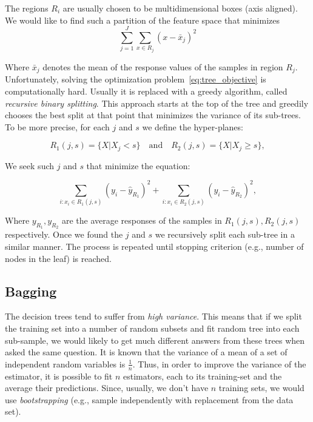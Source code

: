 \documentclass{article}
\newcommand*\mean[1]{\bar{#1}}
\begin{document}
The regions $R_i$ are usually chosen to be multidimensional boxes (axis aligned).  We would like to find such a partition of the feature space that minimizes
\begin{equation}\label{eq:tree_objective}
\sum\limits_{j=1}^J\sum_{x\in R_j}{(x-\mean{x}_j)^2}
\end{equation}

Where $\mean{x}_j$ denotes the mean of the response values of the
samples in region $R_j$.  Unfortunately, solving the optimization
problem~\ref{eq:tree_objective} is computationally hard.  Usually it
is replaced with a greedy algorithm, called \textit{recursive binary
  splitting}.  This approach starts at the top of the tree and
greedily chooses the best split at that point that minimizes the
variance of its sub-trees.  To be more precise, for each $j$ and $s$ we
define the hyper-planes:

\begin{equation}
  R_1(j,s) = \{ X\lvert X_j<s \}\quad\text{and}\quad R_2(j,s) = \{ X\lvert X_j \geq s \},
\end{equation}

We seek such $j$ and $s$ that minimize the equation:

\begin{equation}
  \sum\limits_{i:x_i\in R_1(j,s)}{(y_i-\hat{y}_{R_1})}^2 + \sum\limits_{i:x_i\in R_2(j,s)}{(y_i-\hat{y}_{R_2})}^2,
\end{equation}

Where $y_{R_1}, y_{R_2}$ are the average responses of the samples in
$R_1(j,s), R_2(j,s)$ respectively.  Once we found the $j$ and $s$ we
recursively split each sub-tree in a similar manner.  The process is
repeated until stopping criterion (e.g., number of nodes in the leaf)
is reached.

\subsection{Bagging}
The decision trees tend to suffer from \textit{high variance}. This
means that if we split the training set into a number of random
subsets and fit random tree into each sub-sample, we would likely to
get much different answers from these trees when asked the same
question.  It is known that the variance of a mean of a set of
independent random variables is $\frac{1}{n}$.  Thus, in order to
improve the variance of the estimator, it is possible to fit $n$
estimators, each to its training-set and the average their
predictions.  Since, usually, we don't have $n$ training sets, we
would use \textit{bootstrapping} (e.g., sample independently with
replacement from the data set).
\end{document}
